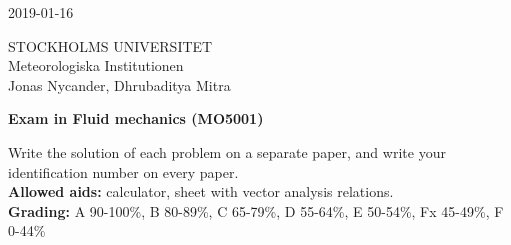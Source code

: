 \documentclass[12pt,a4paper]{article}
\begin{document}
\begin{center}
2019-01-16
\end{center}
STOCKHOLMS UNIVERSITET\\
Meteorologiska Institutionen\\
Jonas Nycander, Dhrubaditya Mitra\\
\vspace{1cm}

\begin{center}
{\bf\large Exam in Fluid mechanics (MO5001)}\\
\end{center}

Write the solution of each problem on a separate paper, and write your identification number on every paper.\\

{\bf Allowed aids:} calculator, sheet with vector analysis relations.\\

{\bf Grading:} A 90-100\%, B 80-89\%, C 65-79\%, D 55-64\%, E 50-54\%, Fx 45-49\%, F 0-44\% \\
\vspace{0.5cm}
\end{document}
